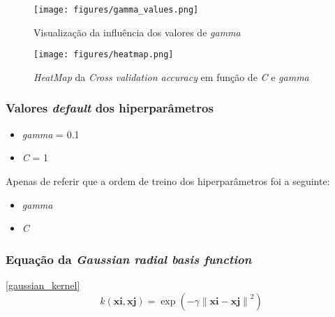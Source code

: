 \begin{figure}[!t]
\centering
\texttt{[image: figures/gamma\_values.png]}
\caption{Visualização da influência dos valores de \textit{gamma}}
\label{fig:gamma_values_influence}
\end{figure}


\begin{figure}[!t]
\centering
\texttt{[image: figures/heatmap.png]}
\caption{\textit{HeatMap} da \textit{Cross validation accuracy} em função de \textit{C} e \textit{gamma}}
\label{fig:heat_map}
\end{figure}



\subsubsection{Valores \textit{default} dos hiperparâmetros}

\begin{itemize}
    \item \textit{gamma} = 0.1
    \item \textit{C} = 1
\end{itemize}

Apenas de referir que a ordem de treino dos hiperparâmetros foi a seguinte:
\begin{itemize}
    \item \textit{gamma}
    \item \textit{C}
\end{itemize}


\subsubsection{Equação da \textit{Gaussian radial basis function}}
\ref{gaussian_kernel}
\begin{equation}
	k(\textbf{xi},\textbf{xj}) = \exp{(-\gamma  \left \| \textbf{xi} - \textbf{xj}   \right \|^{2})}
    \label{gaussian_kernel}
\end{equation}





